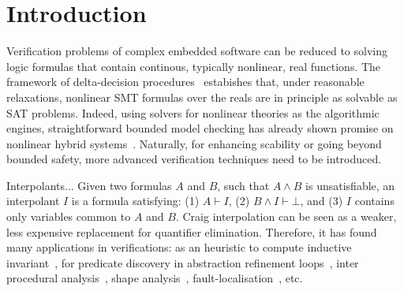 \section{Introduction}
\label{sec:intro}




Verification problems of complex embedded software can be reduced to solving logic formulas that contain continous, typically nonlinear, real functions. The framework of delta-decision procedures~\cite{DBLP:conf/lics/GaoAC12,DBLP:conf/fmcad/GaoKC13} estabishes that, under reasonable relaxations, nonlinear SMT formulas over the reals are in principle as solvable as SAT problems. Indeed, using solvers for nonlinear theories as the algorithmic engines, straightforward bounded model checking has already shown promise on nonlinear hybrid systems~\cite{}. Naturally, for enhancing scability or going beyond bounded safety, more advanced verification techniques need to be introduced. 

Interpolants... Given two formulas $A$ and $B$, such that $A ∧ B$ is unsatisfiable, an interpolant $I$ is a formula satisfying: (1) $A \vdash I$, (2) $B ∧ I \vdash ⊥$, and (3) $I$ contains only variables common to $A$ and $B$.
Craig interpolation can be seen as a weaker, less expensive replacement for quantifier elimination.
Therefore, it has found many applications in verifications:
as an heuristic to compute inductive invariant~\cite{DBLP:conf/cav/McMillan03,DBLP:conf/vmcai/McMillan07,DBLP:conf/sas/McMillan11},
for predicate discovery in abstraction refinement loops~\cite{DBLP:conf/cav/McMillan06},
inter procedural analysis~\cite{DBLP:conf/vmcai/AlbarghouthiGC12,DBLP:conf/cav/AlbarghouthiLGC12},
shape analysis~\cite{DBLP:conf/esop/AlbarghouthiBCK15},
fault-localisation~\cite{DBLP:conf/fm/ErmisSW12,DBLP:conf/vmcai/ChristESW13,DBLP:conf/sigsoft/SchafSW13}, etc.

